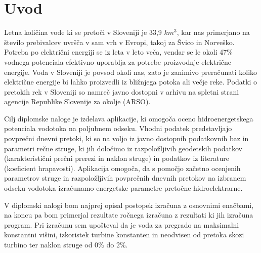 
\chapter{Uvod}\label{sec: Uvod}
\thispagestyle{fancy}



Letna količina vode ki se pretoči v Sloveniji je 33,9 $km^{3}$, kar nas primerjano na število prebivalcev uvršča v sam vrh v Evropi, takoj za Švico in Norveško. Potreba po električni energiji se iz leta v leto veča, vendar se le okoli 47\% vodnega potenciala efektivno uporablja za potrebe proizvodnje električne energije. Voda v Sloveniji je povsod okoli nas, zato je zanimivo preračunati koliko električne energije bi lahko proizvedli iz bližnjega potoka ali večje reke. Podatki o pretokih rek v Sloveniji so namreč javno dostopni v arhivu na spletni strani agencije Republike Slovenije za okolje (ARSO). \cite{HEnaSrednjiSavi}


Cilj diplomske naloge je izdelava aplikacije, ki omogoča oceno hidroenergetskega potenciala vodotoka na poljubnem odseku. Vhodni podatek predstavljajo povprečni dnevni pretoki, ki so na voljo iz javno dostopnih podatkovnih baz in parametri rečne struge, ki jih določimo iz razpoložljivih geodetskih podatkov (karakteristični prečni prerezi in naklon struge) in podatkov iz literature (koeficient hrapavosti). Aplikacija omogoča, da s pomočjo začetno ocenjenih parametrov struge in razpoložljivih povprečnih dnevnih pretokov na izbranem odseku vodotoka izračunamo energetske parametre pretočne hidroelektrarne.



V diplomski nalogi bom najprej opisal postopek izračuna z osnovnimi enačbami, na koncu pa bom primerjal rezultate ročnega izračuna z rezultati ki jih izračuna program. Pri izračunu sem upošteval da je voda za pregrado na maksimalni konstantni višini, izkoristek turbine konstanten in neodvisen od pretoka skozi turbino ter naklon struge od 0\% do 2\%.



